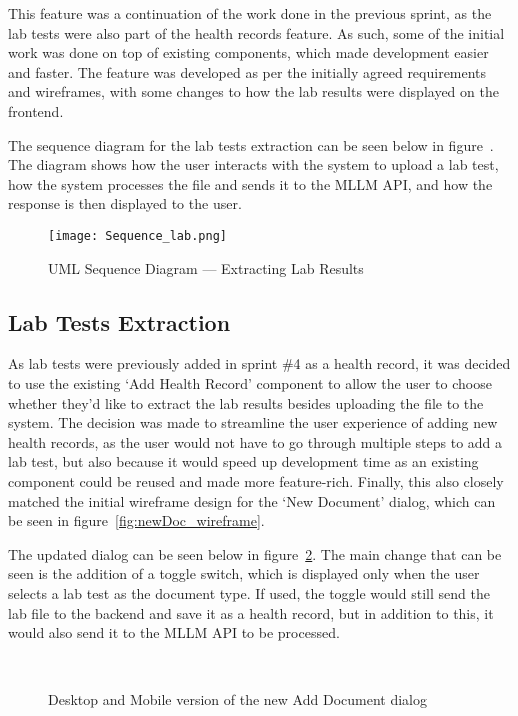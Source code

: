 This feature was a continuation of the work done in the previous sprint, as the lab tests were also part of the health records feature. As such, some of the initial work was done on top of existing components, which made development easier and faster. The feature was developed as per the initially agreed requirements and wireframes, with some changes to how the lab results were displayed on the frontend.

The sequence diagram for the lab tests extraction can be seen below in figure~. The diagram shows how the user interacts with the system to upload a lab test, how the system processes the file and sends it to the MLLM API, and how the response is then displayed to the user.

\begin{figure}[htbp]
  \centering
  \texttt{[image: Sequence\_lab.png]}
  \caption{UML Sequence Diagram --- Extracting Lab Results}\label{fig:sequence_lab}
\end{figure}

\subsection{Lab Tests Extraction}

As lab tests were previously added in sprint \#4 as a health record, it was decided to use the existing `Add Health Record' component to allow the user to choose whether they'd like to extract the lab results besides uploading the file to the system. The decision was made to streamline the user experience of adding new health records, as the user would not have to go through multiple steps to add a lab test, but also because it would speed up development time as an existing component could be reused and made more feature-rich. Finally, this also closely matched the initial wireframe design for the `New Document' dialog, which can be seen in figure~\ref{fig:newDoc_wireframe}.

The updated dialog can be seen below in figure~\ref{fig:labs_addDoc}. The main change that can be seen is the addition of a toggle switch, which is displayed only when the user selects a lab test as the document type. If used, the toggle would still send the lab file to the backend and save it as a health record, but in addition to this, it would also send it to the MLLM API to be processed. 

\begin{figure}[ht]
  \centering
  \\[\baselineskip]
  \caption{Desktop and Mobile version of the new Add Document dialog}\label{fig:labs_addDoc}
\end{figure}

